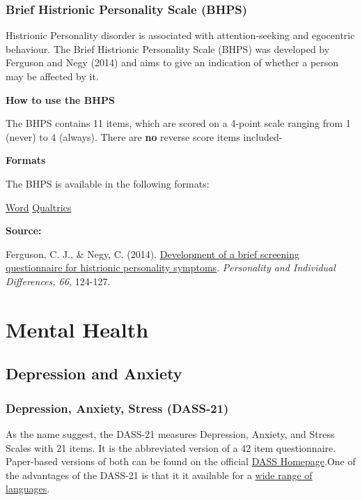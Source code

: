 \documentclass[
]{book}
\begin{document}
\hypertarget{brief-histrionic-personality-scale-bhps}{%
\subsection{Brief Histrionic Personality Scale (BHPS)}\label{brief-histrionic-personality-scale-bhps}}

Histrionic Personality disorder is associated with attention-seeking and egocentric behaviour. The Brief Histrionic Personality Scale (BHPS) was developed by Ferguson and Negy (2014) and aims to give an indication of whether a person may be affected by it.

\textbf{How to use the BHPS}

The BHPS contains 11 items, which are scored on a 4-point scale ranging from 1 (never) to 4 (always). There are \textbf{no} reverse score items included-

\textbf{Formats}

The BHPS is available in the following formats:

\href{/questionnaires/BriefHistrionicPersonalityScale.docx}{Word} \textbar{} \href{/questionnaires/BriefHistrionicPersonalityScale.qsf}{Qualtrics}

\textbf{Source:}

Ferguson, C. J., \& Negy, C. (2014). \href{https://www.christopherjferguson.com/Histrionic.pdf}{Development of a brief screening questionnaire for histrionic personality symptoms}. \emph{Personality and Individual Differences, 66,} 124-127.

\hypertarget{mental-health}{%
\chapter{Mental Health}\label{mental-health}}

\hypertarget{depression-and-anxiety}{%
\section{Depression and Anxiety}\label{depression-and-anxiety}}

\hypertarget{depression-anxiety-stress-dass-21}{%
\subsection{Depression, Anxiety, Stress (DASS-21)}\label{depression-anxiety-stress-dass-21}}

As the name suggest, the DASS-21 measures Depression, Anxiety, and Stress Scales with 21 items. It is the abbreviated version of a 42 item questionnaire. Paper-based versions of both can be found on the official \href{http://www2.psy.unsw.edu.au/groups/dass/}{DASS Homepage}.One of the advantages of the DASS-21 is that it it available for a \href{http://www2.psy.unsw.edu.au/groups/dass/translations.htm}{wide range of languages}.
\end{document}
